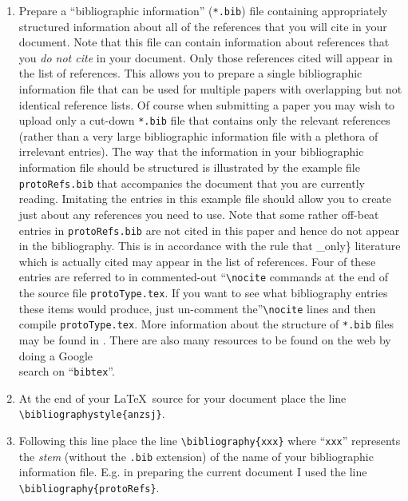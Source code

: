 \documentclass[
  times,
  doublespace]{anzsauth}
\providecommand{\tightlist}{%
  \setlength{\itemsep}{0pt}\setlength{\parskip}{0pt}}\usepackage{longtable,booktabs,array}
\begin{document}
\begin{enumerate}
\def\labelenumi{\arabic{enumi}.}
\tightlist
\item
  Prepare a ``bibliographic information'' (\texttt{*.bib}) file
  containing appropriately structured information about all of the
  references that you will cite in your document. Note that this file
  can contain information about references that you \emph{do not cite}
  in your document. Only those references cited will appear in the list
  of references. This allows you to prepare a single bibliographic
  information file that can be used for multiple papers with overlapping
  but not identical reference lists. Of course when submitting a paper
  you may wish to upload only a cut-down \texttt{*.bib} file that
  contains only the relevant references (rather than a very large
  bibliographic information file with a plethora of irrelevant entries).
  The way that the information in your bibliographic information file
  should be structured is illustrated by the example file
  \texttt{protoRefs.bib} that accompanies the document that you are
  currently reading. Imitating the entries in this example file should
  allow you to create just about any references you need to use. Note
  that some rather off-beat entries in \texttt{protoRefs.bib} are not
  cited in this paper and hence do not appear in the bibliography. This
  is in accordance with the rule that \_only\} literature which is
  actually cited may appear in the list of references. Four of these
  entries are referred to in commented-out
  ``\texttt{\textbackslash{}nocite} commands at the end of the source
  file \texttt{protoType.tex}. If you want to see what bibliography
  entries these items would produce, just un-comment
  the''\texttt{\textbackslash{}nocite} lines and then compile
  \texttt{protoType.tex}. More information about the structure of
  \texttt{*.bib} files may be found in \citet{MittelbachGoossens2004}.
  There are also many resources to be found on the web by doing a
  Google\texttrademark\\
  search on ``\texttt{bibtex}''.
\item
  At the end of your \LaTeX~source for your document place the line
  \texttt{\textbackslash{}bibliographystyle\{anzsj\}}.
\item
  Following this line place the line
  \texttt{\textbackslash{}bibliography\{xxx\}} where ``\texttt{xxx}''
  represents the \emph{stem} (without the \texttt{.bib} extension) of
  the name of your bibliographic information file. E.g. in preparing the
  current document I used the line
  \texttt{\textbackslash{}bibliography\{protoRefs\}}.
\end{enumerate}
\end{document}
